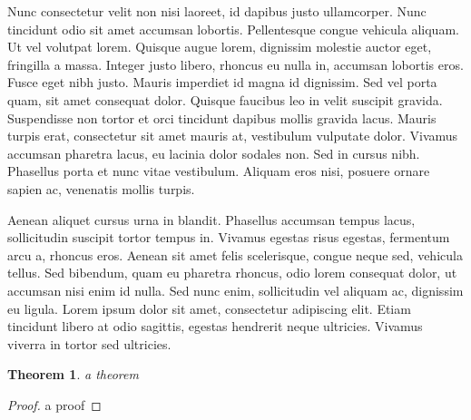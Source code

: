\documentclass[11pt]{personal} %
\theoremstyle{plain}
\newtheorem{thm}[defn]{Theorem}
\theoremstyle{remark}
\begin{document}
Nunc consectetur velit non nisi laoreet, id dapibus justo ullamcorper. Nunc tincidunt odio sit amet accumsan lobortis. Pellentesque congue vehicula aliquam. Ut vel volutpat lorem. Quisque augue lorem, dignissim molestie auctor eget, fringilla a massa. Integer justo libero, rhoncus eu nulla in, accumsan lobortis eros. Fusce eget nibh justo. Mauris imperdiet id magna id dignissim. Sed vel porta quam, sit amet consequat dolor. Quisque faucibus leo in velit suscipit gravida. Suspendisse non tortor et orci tincidunt dapibus mollis gravida lacus. Mauris turpis erat, consectetur sit amet mauris at, vestibulum vulputate dolor. Vivamus accumsan pharetra lacus, eu lacinia dolor sodales non. Sed in cursus nibh. Phasellus porta et nunc vitae vestibulum. Aliquam eros nisi, posuere ornare sapien ac, venenatis mollis turpis.

Aenean aliquet cursus urna in blandit. Phasellus accumsan tempus lacus, sollicitudin suscipit tortor tempus in. Vivamus egestas risus egestas, fermentum arcu a, rhoncus eros. Aenean sit amet felis scelerisque, congue neque sed, vehicula tellus. Sed bibendum, quam eu pharetra rhoncus, odio lorem consequat dolor, ut accumsan nisi enim id nulla. Sed nunc enim, sollicitudin vel aliquam ac, dignissim eu ligula. Lorem ipsum dolor sit amet, consectetur adipiscing elit. Etiam tincidunt libero at odio sagittis, egestas hendrerit neque ultricies. Vivamus viverra in tortor sed ultricies. 

\begin{thm}
a theorem
\end{thm}

\begin{proof}
a proof
\end{proof}

\cite{liu}
\cite{faithfulaction}


\end{document}
